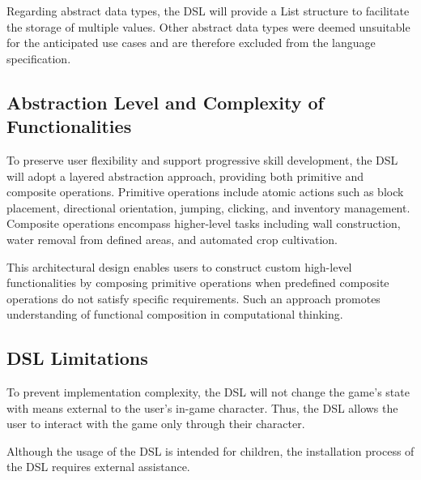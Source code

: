 Regarding abstract data types, the DSL will provide a List structure to facilitate the storage of multiple values. 
Other abstract data types were deemed unsuitable for the anticipated use cases and are therefore excluded from the language specification.

\subsection{Abstraction Level and Complexity of Functionalities}

To preserve user flexibility and support progressive skill development, the DSL will adopt a layered abstraction approach, providing both primitive and composite operations. 
Primitive operations include atomic actions such as block placement, directional orientation, jumping, clicking, and inventory management. 
Composite operations encompass higher-level tasks including wall construction, water removal from defined areas, and automated crop cultivation.

This architectural design enables users to construct custom high-level functionalities by composing primitive operations when predefined composite operations do not satisfy specific requirements. 
Such an approach promotes understanding of functional composition in computational thinking.

\subsection{DSL Limitations}

To prevent implementation complexity, the DSL will not change the game's state with means external to the user's in-game character. 
Thus, the DSL allows the user to interact with the game only through their character.

Although the usage of the DSL is intended for children, the installation process of the DSL requires external assistance.
